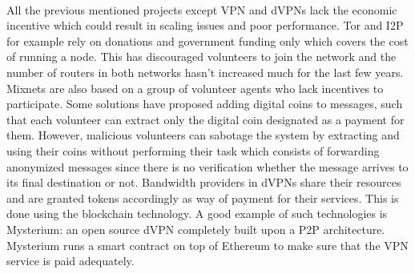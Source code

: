 \\All the previous mentioned projects except VPN and dVPNs lack the economic incentive which could result in scaling issues and poor performance. Tor and I2P for example rely on donations and government funding only which covers the cost of running a node. This has discouraged volunteers to join the network and the number of routers in both networks hasn't increased much for the last few years.  Mixnets are also based on a group of volunteer agents who lack incentives to participate. Some solutions have proposed adding digital coins to messages, such that each volunteer can extract only the digital coin designated as a payment for them. However, malicious volunteers can sabotage the system by extracting and using their coins without performing their task which consists of forwarding anonymized messages since there is no verification whether the message arrives to its final destination or not. Bandwidth providers in dVPNs share their resources and are granted tokens accordingly as way of payment for their services. This is done using the blockchain technology. A good example of such technologies is Mysterium: an open source dVPN completely built upon a P2P architecture. Mysterium runs a smart contract on top of Ethereum to make sure that the VPN service is paid adequately.

